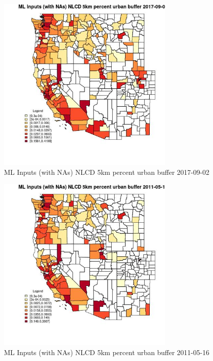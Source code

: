 \begin{figure} 
\centering  
\includegraphics[width=0.77\textwidth]{Code_Outputs/Report_ML_input_PM25_Step4_part_e_de_duplicated_aves_compiled_2019-05-21wNAs_CountyNLCD_5km_percent_urban_bufferMean2017-09-02.jpg} 
\caption{\label{fig:Report_ML_input_PM25_Step4_part_e_de_duplicated_aves_compiled_2019-05-21wNAsCountyNLCD_5km_percent_urban_bufferMean2017-09-02}ML Inputs (with NAs) NLCD 5km percent urban buffer 2017-09-02} 
\end{figure} 
 

\begin{figure} 
\centering  
\includegraphics[width=0.77\textwidth]{Code_Outputs/Report_ML_input_PM25_Step4_part_e_de_duplicated_aves_compiled_2019-05-21wNAs_CountyNLCD_5km_percent_urban_bufferMean2011-05-16.jpg} 
\caption{\label{fig:Report_ML_input_PM25_Step4_part_e_de_duplicated_aves_compiled_2019-05-21wNAsCountyNLCD_5km_percent_urban_bufferMean2011-05-16}ML Inputs (with NAs) NLCD 5km percent urban buffer 2011-05-16} 
\end{figure} 
 


